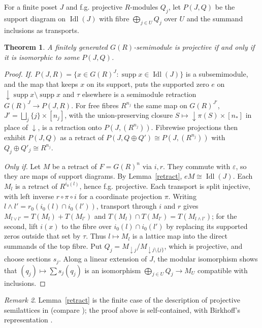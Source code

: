 \documentclass[11pt]{amsart}
\newtheorem{theorem}{Theorem}[section]
\theoremstyle{remark}\newtheorem{remark}[theorem]{Remark}
\begin{document}
For a finite poset $J$ and f.g. projective $R$-modules $Q_j$, let $P(J,Q)$ be the support diagram on
$\operatorname{Idl}(J)$ with fibre $\bigoplus_{j\in U}Q_j$ over $U$ and the summand inclusions as transports.

\begin{theorem}\label{proj}
A finitely generated $G(R)$-semimodule is projective if and only if it is isomorphic to some $P(J,Q)$.
\end{theorem}
\begin{proof}
\emph{If.} $P(J,R)=\{x\in G(R)^J:\operatorname{supp}x\in\operatorname{Idl}(J)\}$ is a subsemimodule, and the map that
keeps $x$ on its support, puts the supported zero $e$ on ${\downarrow}\operatorname{supp}x\setminus\operatorname{supp}x$
and $\tau$ elsewhere is a semimodule retraction $G(R)^J\to P(J,R)$. For free fibres $R^{n_j}$ the same map on
$G(R)^{J'}$, $J'=\bigsqcup_j\{j\}\times[n_j]$, with the union-preserving closure $S\mapsto{\downarrow}\pi(S)\times[n_\ast]$
in place of ${\downarrow}$, is a retraction onto $P(J,(R^{n_j}))$. Fibrewise projections then exhibit $P(J,Q)$ as a
retract of $P(J,Q\oplus Q')\cong P(J,(R^{n_j}))$ with $Q_j\oplus Q'_j\cong R^{n_j}$.

\emph{Only if.} Let $M$ be a retract of $F=G(R)^n$ via $i,r$. They commute with $\varepsilon$, so they are maps of
support diagrams. By Lemma~\ref{retract}, $eM\cong\operatorname{Idl}(J)$. Each $M_l$ is a retract of
$R^{i_0(l)}$, hence f.g. projective. Each transport is split injective, with left inverse $r\circ\pi\circ i$ for a
coordinate projection $\pi$. Writing $l\wedge l'=r_0(i_0(l)\cap i_0(l'))$, transport through $i$ and $r$ gives
$M_{l\vee l'}=T(M_l)+T(M_{l'})$ and $T(M_l)\cap T(M_{l'})=T(M_{l\wedge l'})$; for the second, lift $i(x)$ to the fibre
over $i_0(l)\cap i_0(l')$ by replacing its supported zeros outside that set by $\tau$. Thus $l\mapsto M_l$ is a lattice
map into the direct summands of the top fibre. Put $Q_j=M_{\downarrow j}/M_{\downarrow j\setminus\{j\}}$, which is
projective, and choose sections $s_j$. Along a linear extension of $J$, the modular isomorphism shows that
$(q_j)\mapsto\sum s_j(q_j)$ is an isomorphism $\bigoplus_{j\in U}Q_j\to M_U$ compatible with inclusions.
\end{proof}

\begin{remark}
Lemma~\ref{retract} is the finite case of the description of projective semilattices in \cite{hk} (compare
\cite{bh}); the proof above is self-contained, with Birkhoff's representation \cite{birkhoff}.
\end{remark}
\end{document}

